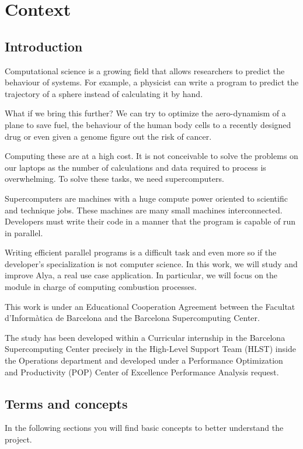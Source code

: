 \section{Context}

\subsection{Introduction}

\justify
Computational science is a growing field that allows researchers to predict the behaviour of systems. For example, a physicist can write a program to predict the trajectory of a sphere instead of calculating it by hand.

\justify
 What if we bring this further?  We can try to optimize the aero-dynamism of a plane to save fuel, the behaviour of the human body cells to a recently designed drug or even given a genome figure out the risk of cancer.

\justify
Computing these are at a high cost. It is not conceivable to solve the problems on our laptops as the number of calculations and data required to process is overwhelming. To solve these tasks, we need supercomputers.

\justify
Supercomputers are machines with a huge compute power oriented to scientific and technique jobs. These machines are many small machines interconnected. Developers must write their code in a manner that the program is capable of run in parallel. 

\justify
Writing efficient parallel programs is a difficult task and even more so if the developer's specialization is not computer science. In this work, we will study and improve Alya\cite{alya}, a real use case application. In particular, we will focus on the module in charge of computing combustion processes.


\justify
This work is under an Educational Cooperation Agreement between the Facultat d'Informàtica de Barcelona and the Barcelona Supercomputing Center.

\justify
The study has been developed within a Curricular internship in the Barcelona Supercomputing Center precisely in the High-Level Support Team (HLST) inside the Operations department and developed under a Performance Optimization and Productivity\cite{popWeb} (POP) Center of Excellence Performance Analysis request.

\subsection{Terms and concepts}
\justify
In the following sections you will find basic concepts to better understand the project.

